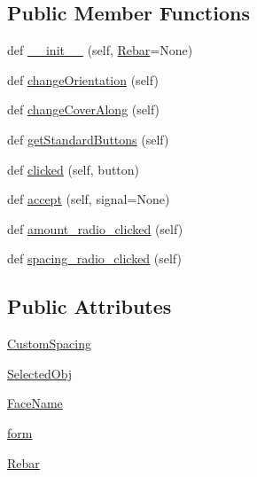 \subsection*{Public Member Functions}
\begin{DoxyCompactItemize}
\item 
def \hyperlink{classStraightRebar_1_1__StraightRebarTaskPanel_ad740c5f357b97a2a327e7494bf2b712b}{\+\_\+\+\_\+init\+\_\+\+\_\+} (self, \hyperlink{classStraightRebar_1_1__StraightRebarTaskPanel_a23fe17475277eae59cbed538f0f183cb}{Rebar}=None)
\item 
def \hyperlink{classStraightRebar_1_1__StraightRebarTaskPanel_abd7abec4d263edf53efb18396857b370}{change\+Orientation} (self)
\item 
def \hyperlink{classStraightRebar_1_1__StraightRebarTaskPanel_ae99010cf766375812bf24f80cd3f60e1}{change\+Cover\+Along} (self)
\item 
def \hyperlink{classStraightRebar_1_1__StraightRebarTaskPanel_a657fa849f5c787db2303dac9024d8a98}{get\+Standard\+Buttons} (self)
\item 
def \hyperlink{classStraightRebar_1_1__StraightRebarTaskPanel_a8190e8acf6121a5fe3b58d968ef17300}{clicked} (self, button)
\item 
def \hyperlink{classStraightRebar_1_1__StraightRebarTaskPanel_ad8a49d3d30ef3308b8386c9ebe1b67d8}{accept} (self, signal=None)
\item 
def \hyperlink{classStraightRebar_1_1__StraightRebarTaskPanel_a845630e065bb13e756284e71476dd755}{amount\+\_\+radio\+\_\+clicked} (self)
\item 
def \hyperlink{classStraightRebar_1_1__StraightRebarTaskPanel_a03ed1cd992f5b138153b6a45de7777f9}{spacing\+\_\+radio\+\_\+clicked} (self)
\end{DoxyCompactItemize}
\subsection*{Public Attributes}
\begin{DoxyCompactItemize}
\item 
\hyperlink{classStraightRebar_1_1__StraightRebarTaskPanel_a91d60c0007437af93af933a29c66a963}{Custom\+Spacing}
\item 
\hyperlink{classStraightRebar_1_1__StraightRebarTaskPanel_a4bdbe85e1cc468f34a907db99faebe85}{Selected\+Obj}
\item 
\hyperlink{classStraightRebar_1_1__StraightRebarTaskPanel_afe733532cc15a149f9ba8f7da4515413}{Face\+Name}
\item 
\hyperlink{classStraightRebar_1_1__StraightRebarTaskPanel_a88b76fa56bfa51be091abb0cde42a0e0}{form}
\item 
\hyperlink{classStraightRebar_1_1__StraightRebarTaskPanel_a23fe17475277eae59cbed538f0f183cb}{Rebar}
\end{DoxyCompactItemize}


